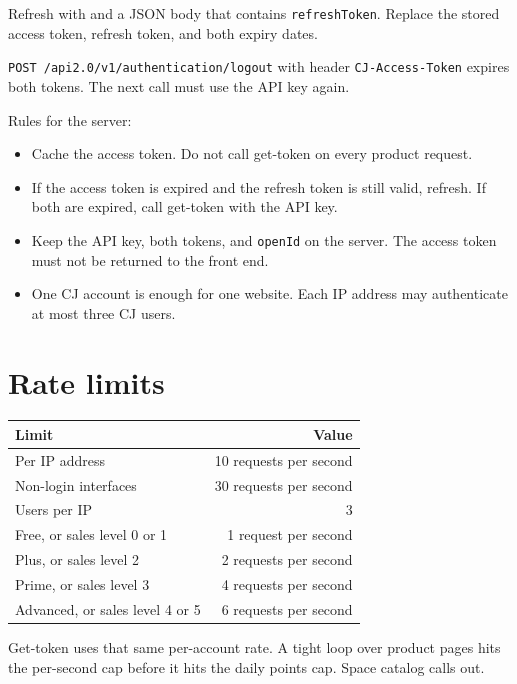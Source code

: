 \documentclass[11pt]{article}
\begin{document}
Refresh with  and a JSON body that contains \texttt{refreshToken}. Replace the stored access token, refresh token, and both expiry dates.

\texttt{POST /api2.0/v1/authentication/logout} with header \texttt{CJ-Access-Token} expires both tokens. The next call must use the API key again.

Rules for the server:

\begin{itemize}
  \item Cache the access token. Do not call get-token on every product request.
  \item If the access token is expired and the refresh token is still valid, refresh. If both are expired, call get-token with the API key.
  \item Keep the API key, both tokens, and \texttt{openId} on the server. The access token must not be returned to the front end.
  \item One CJ account is enough for one website. Each IP address may authenticate at most three CJ users.
\end{itemize}

\section{Rate limits}

\begin{center}
\begin{tabular}{@{}lr@{}}
\toprule
Limit & Value \\
\midrule
Per IP address & 10 requests per second \\
Non-login interfaces & 30 requests per second \\
Users per IP & 3 \\
Free, or sales level 0 or 1 & 1 request per second \\
Plus, or sales level 2 & 2 requests per second \\
Prime, or sales level 3 & 4 requests per second \\
Advanced, or sales level 4 or 5 & 6 requests per second \\
\bottomrule
\end{tabular}
\end{center}

Get-token uses that same per-account rate. A tight loop over product pages hits the per-second cap before it hits the daily points cap. Space catalog calls out.
\end{document}
